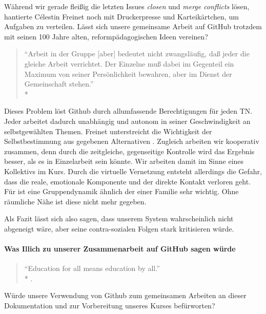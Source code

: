 Während wir gerade fleißig die letzten Issues \emph{closen} und \emph{merge conflicts} lösen, hantierte Célestin Freinet noch mit Druckerpresse und Karteikärtchen, um Aufgaben zu verteilen.
Lässt sich unsere gemeinsame Arbeit auf GitHub trotzdem mit seinen 100 Jahre alten, reformpädagogischen Ideen vereinen?

\begin{quote}
	``Arbeit in der Gruppe [aber] bedeutet nicht zwangsläufig, daß jeder die gleiche Arbeit verrichtet. Der Einzelne muß dabei im Gegenteil ein Maximum von seiner Persönlichkeit bewahren, aber im Dienst der Gemeinschaft stehen.''\\*
	\parencite[510]{Freinet-2000a}
\end{quote}

Dieses Problem löst Github durch allumfassende Berechtigungen für jeden TN.
Jeder arbeitet dadurch unabhängig und autonom in seiner Geschwindigkeit an selbstgewählten Themen.
Freinet unterstreicht die Wichtigkeit der Selbstbestimmung aus gegebenen Alternativen \parencite[vgl.][495]{Freinet-2000a}.
Zugleich arbeiten wir kooperativ zusammen, denn durch die zeitgleiche, gegenseitige Kontrolle wird das Ergebnis besser, als es in Einzelarbeit sein könnte.
Wir arbeiten damit im Sinne eines Kollektivs im Kurs.
Durch die virtuelle Vernetzung entsteht allerdings die Gefahr, dass die reale, emotionale Komponente und der direkte Kontakt verloren geht.
Für \citeauthor{Freinet-2000a} ist eine Gruppendynamik ähnlich der einer Familie sehr wichtig.
Ohne räumliche Nähe ist diese nicht mehr gegeben.

Als Fazit lässt sich also sagen, dass \citeauthor{Freinet-2000a} unserem System wahrscheinlich nicht abgeneigt wäre, aber seine contra-sozialen Folgen stark kritisieren würde.


\paragraph{Was Illich zu unserer Zusammenarbeit auf GitHub sagen würde}

\begin{quote}
	``Education for all means education by all.''\\*
	\parencite[17]{Illich-1971}.
\end{quote}

Würde \citeauthor{Illich-1971} unsere Verwendung von Github zum gemeinsamen Arbeiten an dieser Dokumentation und zur Vorbereitung unseres Kurses befürworten?

